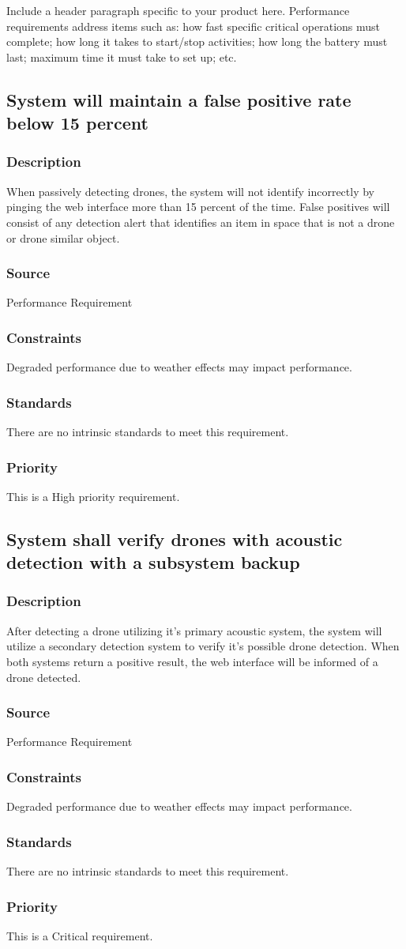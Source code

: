 Include a header paragraph specific to your product here. Performance requirements address items such as: how fast specific critical operations must complete; how long it takes to start/stop activities; how long the battery must last; maximum time it must take to set up; etc.

\subsection{System will maintain a false positive rate below 15 percent}
\subsubsection{Description}
When passively detecting drones, the system will not identify incorrectly by pinging the web interface more than 15 percent of the time. False positives will consist of any detection alert that identifies an item in space that is not a drone or drone similar object.
\subsubsection{Source}
Performance Requirement
\subsubsection{Constraints}
Degraded performance due to weather effects may impact performance.
\subsubsection{Standards}
There are no intrinsic standards to meet this requirement.
\subsubsection{Priority}
This is a High priority requirement.

\subsection{System shall verify drones with acoustic detection with a subsystem backup}
\subsubsection{Description}
After detecting a drone utilizing it's primary acoustic system, the system will utilize a secondary detection system to verify it's possible drone detection. When both systems return a positive result, the web interface will be informed of a drone detected.
\subsubsection{Source}
Performance Requirement
\subsubsection{Constraints}
Degraded performance due to weather effects may impact performance.
\subsubsection{Standards}
There are no intrinsic standards to meet this requirement.
\subsubsection{Priority}
This is a Critical requirement.